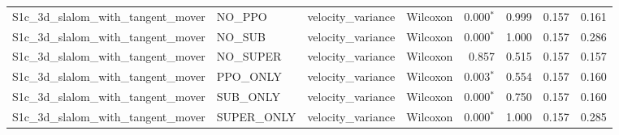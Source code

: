 \begin{tabular}{llllrrrl}
  S1c_3d_slalom_with_tangent_mover & NO_PPO & velocity_variance & Wilcoxon & 0.000$^{*}$ & 0.999 & 0.157 & 0.161 \\
  S1c_3d_slalom_with_tangent_mover & NO_SUB & velocity_variance & Wilcoxon & 0.000$^{*}$ & 1.000 & 0.157 & 0.286 \\
  S1c_3d_slalom_with_tangent_mover & NO_SUPER & velocity_variance & Wilcoxon & 0.857 & 0.515 & 0.157 & 0.157 \\
  S1c_3d_slalom_with_tangent_mover & PPO_ONLY & velocity_variance & Wilcoxon & 0.003$^{*}$ & 0.554 & 0.157 & 0.160 \\
  S1c_3d_slalom_with_tangent_mover & SUB_ONLY & velocity_variance & Wilcoxon & 0.000$^{*}$ & 0.750 & 0.157 & 0.160 \\
  S1c_3d_slalom_with_tangent_mover & SUPER_ONLY & velocity_variance & Wilcoxon & 0.000$^{*}$ & 1.000 & 0.157 & 0.285 \\
\bottomrule
\end{tabular}